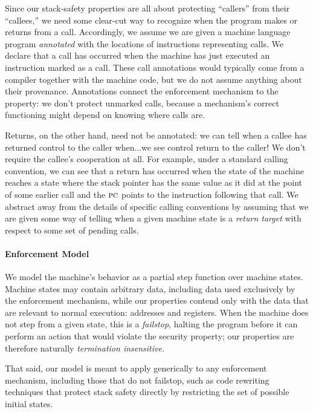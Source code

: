 \documentclass[10pt,conference]{ieeetran}%
\theoremstyle{definition}
\begin{document}
Since our stack-safety properties are all about protecting ``callers'' from
their ``callees,'' we need some clear-cut way to recognize when the program
makes or returns from a call.  Accordingly, we assume we are given a machine
language program {\em annotated} with the locations of instructions
representing calls.  We declare that a call has occurred when the machine
has just executed an instruction marked as a call.
%
These call annotations would typically come from a compiler together with
the machine code, but we do not assume anything about their provenance.
Annotations connect the enforcement mechanism to the property: we don't
protect unmarked calls, because a mechanism's correct functioning might
depend on knowing where calls are.

Returns, on the other hand, need not be annotated: we can tell when a callee
has returned control to the caller when...we see control return to the
caller! We don't require the callee's cooperation at all.
For example, under a standard calling convention, we can see that a
return has occurred when the state of the machine reaches a state where
the stack pointer has the same value as it did at the point of some earlier
call and the $\textsc{pc}$ points to the instruction following that call.  We
abstract away from the details of specific calling conventions by assuming
that we are given some way of telling when a given machine state is a
{\em return target} with respect to some set of pending calls.

\paragraph*{Enforcement Model}

We model the machine's behavior as a partial step function over machine states.
Machine states may contain arbitrary data, including data used exclusively by the
enforcement mechanism, while our properties contend only with the data that are
relevant to normal execution: addresses and registers.
When the machine does not step from a given state, this
is a {\em failstop}, halting the program before it can perform an
action that would violate the security property;
our properties are therefore naturally \emph{termination insensitive.}

That said, our model is meant to apply generically to any enforcement mechanism,
including those that do not failstop, such as
code rewriting techniques that protect stack safety directly by
restricting the set of possible initial states.
\end{document}
